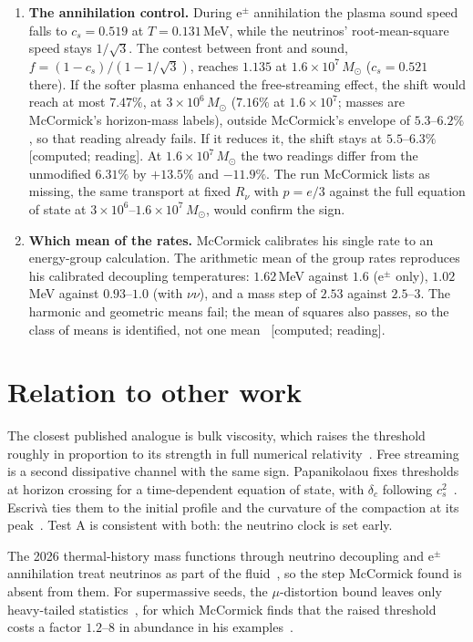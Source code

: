 \documentclass[11pt]{article}
\newcommand{\grade}[1]{\textsf{\small[#1]}}
\begin{document}
\begin{enumerate}
\item \textbf{The annihilation control.} During e$^\pm$ annihilation the plasma sound speed falls to $c_s=0.519$ at $T=0.131$\,MeV, while the neutrinos' root-mean-square speed stays $1/\sqrt3$. The contest between front and sound, $f=(1-c_s)/(1-1/\sqrt3)$, reaches $1.135$ at $1.6\times10^7\,M_\odot$ ($c_s=0.521$ there). If the softer plasma enhanced the free-streaming effect, the shift would reach at most $7.47\%$, at $3\times10^6\,M_\odot$ ($7.16\%$ at $1.6\times10^7$; masses are McCormick's horizon-mass labels), outside McCormick's envelope of $5.3$--$6.2\%$, so that reading already fails. If it reduces it, the shift stays at $5.5$--$6.3\%$ \grade{computed; reading}. At $1.6\times10^7\,M_\odot$ the two readings differ from the unmodified $6.31\%$ by $+13.5\%$ and $-11.9\%$. The run McCormick lists as missing, the same transport at fixed $R_\nu$ with $p=e/3$ against the full equation of state at $3\times10^6$--$1.6\times10^7\,M_\odot$, would confirm the sign.
\item \textbf{Which mean of the rates.} McCormick calibrates his single rate to an energy-group calculation. The arithmetic mean of the group rates reproduces his calibrated decoupling temperatures: $1.62$\,MeV against $1.6$ (e$^\pm$ only), $1.02$\,MeV against $0.93$--$1.0$ (with $\nu\nu$), and a mass step of $2.53$ against $2.5$--$3$. The harmonic and geometric means fail; the mean of squares also passes, so the class of means is identified, not one mean~\cite{WB} \grade{computed; reading}.
\end{enumerate}

\section{Relation to other work}

The closest published analogue is bulk viscosity, which raises the threshold roughly in proportion to its strength in full numerical relativity~\cite{Yuwen}. Free streaming is a second dissipative channel with the same sign. Papanikolaou fixes thresholds at horizon crossing for a time-dependent equation of state, with $\delta_c$ following $c_s^2$~\cite{Pap}. Escriv\`a ties them to the initial profile and the curvature of the compaction at its peak~\cite{Esc}. Test A is consistent with both: the neutrino clock is set early.

The 2026 thermal-history mass functions through neutrino decoupling and e$^\pm$ annihilation treat neutrinos as part of the fluid~\cite{Gonin}, so the step McCormick found is absent from them. For supermassive seeds, the $\mu$-distortion bound leaves only heavy-tailed statistics~\cite{Dave}, for which McCormick finds that the raised threshold costs a factor $1.2$--$8$ in abundance in his examples~\cite{McC}.
\end{document}
